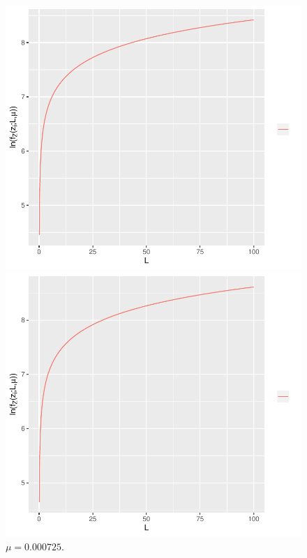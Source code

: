 \documentclass[journal,article,submit,moreauthors,pdftex]{Definitions/mdpi}
\begin{document}
\begin{figure}[hbt]
  \includegraphics[width=\linewidth]{func_max_ver_sigma_51_flev_wishart.pdf}
  	\caption{$\mu=0.000878 $.}\label{func_max_ver_l_z_fixo_mu_51_fixo}
\endminipage\hfill
{}
  \includegraphics[width=\linewidth]{func_max_ver_sigma_61_flev_wishart.pdf}
		\caption{ $\mu=0.000725 $.}\label{func_max_ver_l_z_fixo_mu_61_fixo}

\end{figure}
\end{document}
